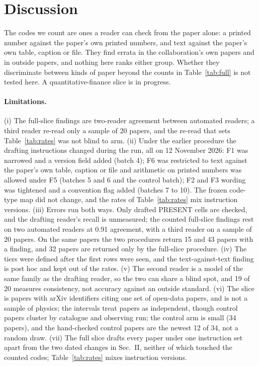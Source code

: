 \documentclass[reprint,amsmath,amssymb,aps,superscriptaddress,nofootinbib]{revtex4-2}
\begin{document}
\section{Discussion}

The codes we count are ones a reader can check from the paper alone: a printed number against the paper's own printed numbers, and text against the paper's own table, caption or file. They find errata in the collaboration's own papers and in outside papers, and nothing here ranks either group. Whether they discriminate between kinds of paper beyond the counts in Table~\ref{tab:full} is not tested here. A quantitative-finance slice is in progress.

\paragraph*{Limitations.} (i) The full-slice findings are two-reader agreement between automated readers; a third reader re-read only a sample of 20 papers, and the re-read that sets Table~\ref{tab:rates} was not blind to arm. (ii) Under the earlier procedure the drafting instructions changed during the run, all on 12 November 2026: F1 was narrowed and a version field added (batch 4); F6 was restricted to text against the paper's own table, caption or file and arithmetic on printed numbers was allowed under F5 (batches 5 and 6 and the control batch); F2 and F3 wording was tightened and a convention flag added (batches 7 to 10). The frozen code-type map did not change, and the rates of Table~\ref{tab:rates} mix instruction versions. (iii) Errors run both ways. Only drafted PRESENT cells are checked, and the drafting reader's recall is unmeasured; the counted full-slice findings rest on two automated readers at 0.91 agreement, with a third reader on a sample of 20 papers. On the same papers the two procedures return 15 and 43 papers with a finding, and 32 papers are returned only by the full-slice procedure. (iv) The tiers were defined after the first rows were seen, and the text-against-text finding is post hoc and kept out of the rates. (v) The second reader is a model of the same family as the drafting reader, so the two can share a blind spot, and 19 of 20 measures consistency, not accuracy against an outside standard. (vi) The slice is papers with arXiv identifiers citing one set of open-data papers, and is not a sample of physics; the intervals treat papers as independent, though control papers cluster by catalogue and observing run; the control arm is small (34 papers), and the hand-checked control papers are the newest 12 of 34, not a random draw. (vii) The full slice drafts every paper under one instruction set apart from the two dated changes in Sec.~II, neither of which touched the counted codes; Table~\ref{tab:rates} mixes instruction versions.
\end{document}
